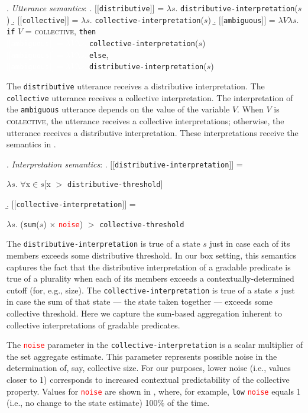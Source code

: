 \documentclass[linguex]{sp}
\newcommand{\sem}[1]{\mbox{$[\![$#1$]\!]$}}
\newcommand{\lam}{$\lambda$}
\begin{document}
 \ex. \emph{Utterance semantics}:
 \a. \sem{\texttt{distributive}} = \lam $s$. \texttt{distributive-interpretation}($s$)
 \b. \sem{\texttt{collective}} = \lam $s$. \texttt{collective-interpretation}($s$)
 \b. \sem{\texttt{ambiguous}} = \lam $V$\lam $s$. \texttt{if} $V$ = \textsc{collective}, \texttt{then}\\  \textcolor{white}{\sem{\texttt{ambiguous}} = \lam $V$\lam $s$. }\texttt{collective-interpretation}($s$)\\
 \textcolor{white}{\sem{\texttt{ambiguous}} = \lam $V$\lam $s$. }\texttt{else}, \\
 \textcolor{white}{\sem{\texttt{ambiguous}} = \lam $V$\lam $s$. }\texttt{distributive-interpretation}($s$)
 
 The \texttt{distributive} utterance receives a distributive interpretation. The \texttt{collective} utterance receives a collective interpretation. The interpretation of the \texttt{ambiguous} utterance depends on the value of the variable $V$. When $V$ is \textsc{collective}, the utterance receives a collective interpretations; otherwise, the utterance receives a distributive interpretation. These interpretations receive the semantics in \Next.
 
 \ex. \emph{Interpretation semantics}:
 \a. \sem{\texttt{distributive-interpretation}} =
\begin{flushright}\lam $s$. $\forall$x$\in$$s$[x $>$ \texttt{distributive-threshold}]\end{flushright}
\b. \sem{\texttt{collective-interpretation}} = 
\begin{flushright}\lam $s$. (\texttt{sum}($s$) $\times$ \textcolor{red}{\texttt{noise}}) $>$ \texttt{collective-threshold}\end{flushright}

The \texttt{distributive-interpretation} is true of a state $s$ just in case each of its members exceeds some distributive threshold. In our box setting, this semantics captures the fact that the distributive interpretation of a gradable predicate is true of a plurality when each of its members exceeds a contextually-determined cutoff (for, e.g., size). The \texttt{collective-interpretation} is true of a state $s$ just in case the sum of that state --- the state taken together --- exceeds some collective threshold. Here we capture the sum-based aggregation inherent to collective interpretations of gradable predicates. 

The \textcolor{red}{\texttt{noise}} parameter in the \texttt{collective-interpretation} is a scalar multiplier of the set aggregate estimate. This parameter represents possible noise in the determination of, say, collective size. For our purposes, lower noise (i.e., values closer to 1) corresponds to increased contextual predictability of the collective property. Values for \textcolor{red}{\texttt{noise}} are shown in \Next, where, for example, \texttt{low} \textcolor{red}{\texttt{noise}} equals 1 (i.e., no change to the state estimate) 100\% of the time.
\end{document}
